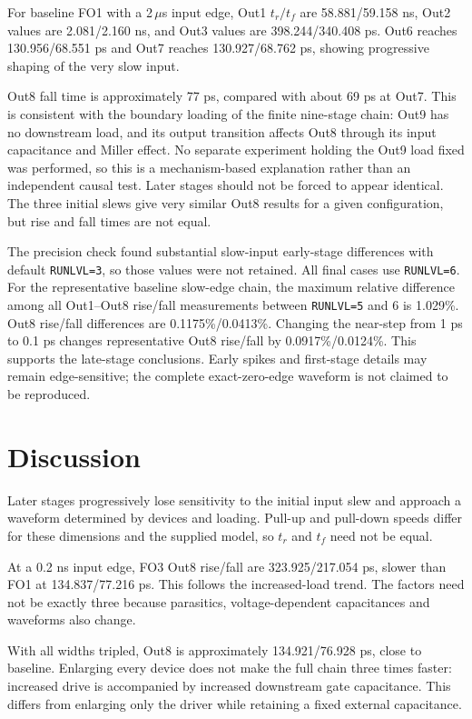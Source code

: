For baseline FO1 with a 2\,$\mu$s input edge, Out1 $t_r/t_f$ are 58.881/59.158 ns, Out2 values are 2.081/2.160 ns, and Out3 values are 398.244/340.408 ps. Out6 reaches 130.956/68.551 ps and Out7 reaches 130.927/68.762 ps, showing progressive shaping of the very slow input.

Out8 fall time is approximately 77 ps, compared with about 69 ps at Out7. This is consistent with the boundary loading of the finite nine-stage chain: Out9 has no downstream load, and its output transition affects Out8 through its input capacitance and Miller effect. No separate experiment holding the Out9 load fixed was performed, so this is a mechanism-based explanation rather than an independent causal test. Later stages should not be forced to appear identical. The three initial slews give very similar Out8 results for a given configuration, but rise and fall times are not equal.

The precision check found substantial slow-input early-stage differences with default \texttt{RUNLVL=3}, so those values were not retained. All final cases use \texttt{RUNLVL=6}. For the representative baseline slow-edge chain, the maximum relative difference among all Out1--Out8 rise/fall measurements between \texttt{RUNLVL=5} and 6 is 1.029\%. Out8 rise/fall differences are 0.1175\%/0.0413\%. Changing the near-step from 1 ps to 0.1 ps changes representative Out8 rise/fall by 0.0917\%/0.0124\%. This supports the late-stage conclusions. Early spikes and first-stage details may remain edge-sensitive; the complete exact-zero-edge waveform is not claimed to be reproduced.

\section{Discussion}
Later stages progressively lose sensitivity to the initial input slew and approach a waveform determined by devices and loading. Pull-up and pull-down speeds differ for these dimensions and the supplied model, so $t_r$ and $t_f$ need not be equal.

At a 0.2 ns input edge, FO3 Out8 rise/fall are 323.925/217.054 ps, slower than FO1 at 134.837/77.216 ps. This follows the increased-load trend. The factors need not be exactly three because parasitics, voltage-dependent capacitances and waveforms also change.

With all widths tripled, Out8 is approximately 134.921/76.928 ps, close to baseline. Enlarging every device does not make the full chain three times faster: increased drive is accompanied by increased downstream gate capacitance. This differs from enlarging only the driver while retaining a fixed external capacitance.

